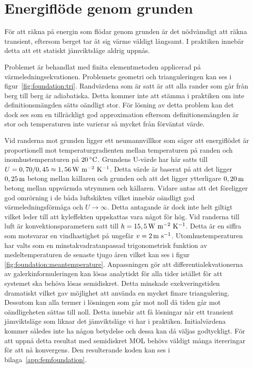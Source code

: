 \section{Energiflöde genom grunden}

För att räkna på energin som flödar genom grunden är det nödvämdigt att räkna
transient, eftersom berget tar åt sig värme väldigt långsamt. I praktiken innebär detta att ett statiskt jämviktsläge aldrig uppnås.

Problemet är behandlat med finita elementmetoden applicerad på värmeledningsekvationen.
Problemets geometri och trianguleringen kan ses i figur~\ref{fig:foundation:tri}.
Randvärdena som är satt är att alla rander som går från berg till berg är adiabatiska.
Detta kommer inte att stämma i praktiken om inte definitionsmängden sätts oändligt
stor. För lösning av detta problem kan det dock ses som en tillräckligt god
approximation eftersom definitionsmängden är stor och temperaturen inte varierar så mycket
från förväntat värde.

Vid randerna mot grunden ligger ett neumannvillkor som säger att energiflödet är proportionell mot temperaturgradienten mellan temperaturen på randen och inomhustemperaturen på $\unit[20]{^\circ C}$.
Grundens U-värde har här satts till $U = 0,70/0,45 \approx \unit[1,56]{W~m^{-2}~K^{-1}}$. Detta värde är
baserat på att det ligger $\unit[0,25]{m}$ betong mellan källaren och grunden och att det ligger ytterligare $\unit[0,20]{m}$
betong mellan uppvärmda utrymmen och källaren. Vidare antas att det föreligger god omrörning i de båda
luftskikten vilket innebär oändligt god värmeledningsförmåga och $U\rightarrow\infty$. Detta antagande är dock inte helt giltigt vilket leder till att kyleffekten
uppskattas vara något för hög.
Vid randerna till luft är konvektionsparametern satt
till $h = \unit[15,5]{W~m^{-2}~K^{-1}}$. Detta är en siffra som motsvarar
en vindhastighet på ungefär $v = \unit[2]{m~s^{-1}}$. Utomhustemperaturen har valts
som en minstakvadratanpassad trigonometrisk funktion av
medeltemperaturen de senaste tjugo åren vilket kan ses i figur~
\ref{fig:foundation:meantemperature}. Anpassningen gör att
differentialekvationerna av galerkinformuleringen kan lösas analytiskt
för alla tider istället för att systemet ska behöva lösas semidiskret.
Detta minskade exekveringstiden dramatiskt vilket gav möjlighet att använda en
mycket finare triangulering. Dessutom kan alla termer i lösningen
som går mot noll då tiden går mot oändligeheten sättas till noll. Detta innebär
att få lösningar når ett transient jämviktsläge som liknar det jämviktsläge vi har i praktiken.
Initialvärdena kommer således inte ha någon betydelse och dessa kan då väljas
godtyckligt. 
För att uppnå detta resultat med semidiskret MOL behövs väldigt många itereringar för att
nå konvergens. Den resulterande koden kan ses i bilaga~\ref{app:femfoundation}.

